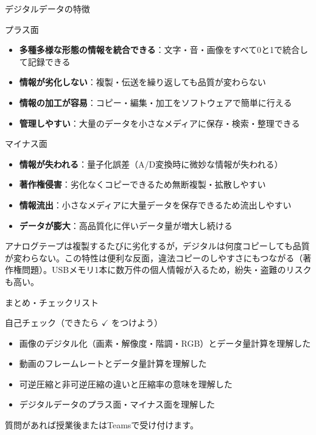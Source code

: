 \documentclass[aspectratio=43,professionalfonts,handout,10pt]{beamer}
\begin{document}
\begin{frame}[shrink=15]{デジタルデータの特徴}
  \begin{block}{プラス面}
    \small
    \begin{itemize}
      \item \textbf{多種多様な形態の情報を統合できる}：文字・音・画像をすべて0と1で統合して記録できる
      \item \textbf{情報が劣化しない}：複製・伝送を繰り返しても品質が変わらない
      \item \textbf{情報の加工が容易}：コピー・編集・加工をソフトウェアで簡単に行える
      \item \textbf{管理しやすい}：大量のデータを小さなメディアに保存・検索・整理できる
    \end{itemize}
  \end{block}

  \begin{exampleblock}{マイナス面}
    \small
    \begin{itemize}
      \item \textbf{情報が失われる}：量子化誤差（A/D変換時に微妙な情報が失われる）
      \item \textbf{著作権侵害}：劣化なくコピーできるため無断複製・拡散しやすい
      \item \textbf{情報流出}：小さなメディアに大量データを保存できるため流出しやすい
      \item \textbf{データが膨大}：高品質化に伴いデータ量が増大し続ける
    \end{itemize}
  \end{exampleblock}

  \begin{slidenote}
    \scriptsize アナログテープは複製するたびに劣化するが，デジタルは何度コピーしても品質が変わらない。この特性は便利な反面，違法コピーのしやすさにもつながる（著作権問題）。USBメモリ1本に数万件の個人情報が入るため，紛失・盗難のリスクも高い。
  \end{slidenote}
\end{frame}


\begin{frame}{まとめ・チェックリスト}
  \begin{block}{自己チェック（できたら $\checkmark$ をつけよう）}
    \begin{itemize}
      \item[$\square$] 画像のデジタル化（画素・解像度・階調・RGB）とデータ量計算を理解した
      \item[$\square$] 動画のフレームレートとデータ量計算を理解した
      \item[$\square$] 可逆圧縮と非可逆圧縮の違いと圧縮率の意味を理解した
      \item[$\square$] デジタルデータのプラス面・マイナス面を理解した
    \end{itemize}
  \end{block}

  \vfill

  {\small 質問があれば授業後またはTeamsで受け付けます。}
\end{frame}
\end{document}
